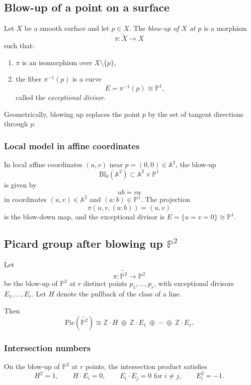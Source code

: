 \documentclass[12pt,a4paper]{article}
\theoremstyle{plain}
\theoremstyle{definition}      %
\begin{document}
\subsection{Blow-up of a point on a surface}

Let $X$ be a smooth surface and let $p\in X$.
The \emph{blow-up of $X$ at $p$} is a morphism
\[
\pi:\widetilde X\to X
\]
such that:
\begin{enumerate}
	\item $\pi$ is an isomorphism over $X\setminus\{p\}$,
	\item the fiber $\pi^{-1}(p)$ is a curve
	\[
	E=\pi^{-1}(p)\cong \mathbb P^1,
	\]
	called the \emph{exceptional divisor}.
\end{enumerate}
Geometrically, blowing up replaces the point $p$ by the set of tangent directions through $p$.

\subsubsection{Local model in affine coordinates}

In local affine coordinates $(u,v)$ near $p=(0,0)\in \mathbb A^2$, the blow-up
\[
\mathrm{Bl}_0(\mathbb A^2)
\subset
\mathbb A^2\times \mathbb P^1
\]
is given by
\[
u b = v a
\]
in coordinates $(u,v)\in \mathbb A^2$ and $(a:b)\in \mathbb P^1$.
The projection
\[
\pi(u,v,(a:b))=(u,v)
\]
is the blow-down map, and the exceptional divisor is $E=\{u=v=0\}\cong \mathbb P^1$.

\subsection*{Picard group after blowing up $\mathbb P^2$}

Let
\[
\pi:\widetilde{\mathbb P^2}\to \mathbb P^2
\]
be the blow-up of $\mathbb P^2$ at $r$ distinct points $p_1,\dots,p_r$, with exceptional divisors $E_1,\dots,E_r$.
Let $H$ denote the pullback of the class of a line.

Then
\[
\mathrm{Pic}(\widetilde{\mathbb P^2})
\cong
\mathbb Z\cdot H\ \oplus\ \mathbb Z\cdot E_1\ \oplus\ \cdots\ \oplus\ \mathbb Z\cdot E_r.
\]

\subsubsection*{Intersection numbers}

On the blow-up of $\mathbb P^2$ at $r$ points, the intersection product satisfies
\[
H^2=1,
\qquad
H\cdot E_i=0,
\qquad
E_i\cdot E_j=0 \text{ for } i\neq j,
\qquad
E_i^2=-1.
\]
\end{document}
